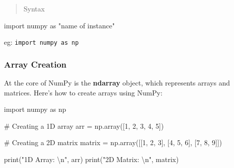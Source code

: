 \documentclass[
  letterpaper,
  DIV=11,
  numbers=noendperiod]{scrreprt}
\newenvironment{Shaded}{\begin{snugshade}}{\end{snugshade}}
\newcommand{\BuiltInTok}[1]{\textcolor[rgb]{0.00,0.23,0.31}{#1}}
\newcommand{\CharTok}[1]{\textcolor[rgb]{0.13,0.47,0.30}{#1}}
\newcommand{\CommentTok}[1]{\textcolor[rgb]{0.37,0.37,0.37}{#1}}
\newcommand{\DecValTok}[1]{\textcolor[rgb]{0.68,0.00,0.00}{#1}}
\newcommand{\ImportTok}[1]{\textcolor[rgb]{0.00,0.46,0.62}{#1}}
\newcommand{\NormalTok}[1]{\textcolor[rgb]{0.00,0.23,0.31}{#1}}
\newcommand{\OperatorTok}[1]{\textcolor[rgb]{0.37,0.37,0.37}{#1}}
\newcommand{\StringTok}[1]{\textcolor[rgb]{0.13,0.47,0.30}{#1}}
\theoremstyle{plain}
\theoremstyle{definition}
\theoremstyle{remark}
\begin{document}
\begin{tcolorbox}[enhanced jigsaw, leftrule=.75mm, bottomtitle=1mm, colback=white, toptitle=1mm, opacitybacktitle=0.6, toprule=.15mm, colbacktitle=quarto-callout-note-color!10!white, arc=.35mm, colframe=quarto-callout-note-color-frame, title=\textcolor{quarto-callout-note-color}{\faInfo}\hspace{0.5em}{Loading \texttt{numpy} to a python programme}, titlerule=0mm, rightrule=.15mm, left=2mm, bottomrule=.15mm, breakable, coltitle=black, opacityback=0]

\begin{quote}
Syntax
\end{quote}

\begin{Shaded}
\begin{Highlighting}[]
\ImportTok{import}\NormalTok{ numpy }\ImportTok{as} \StringTok{"name of instance"}
\end{Highlighting}
\end{Shaded}

eg: \texttt{import\ numpy\ as\ np}

\end{tcolorbox}

\subsubsection{Array Creation}\label{array-creation}

At the core of NumPy is the \textbf{ndarray} object, which represents
arrays and matrices. Here's how to create arrays using NumPy:

\begin{Shaded}
\begin{Highlighting}[]
\ImportTok{import}\NormalTok{ numpy }\ImportTok{as}\NormalTok{ np}

\CommentTok{\# Creating a 1D array}
\NormalTok{arr }\OperatorTok{=}\NormalTok{ np.array([}\DecValTok{1}\NormalTok{, }\DecValTok{2}\NormalTok{, }\DecValTok{3}\NormalTok{, }\DecValTok{4}\NormalTok{, }\DecValTok{5}\NormalTok{])}

\CommentTok{\# Creating a 2D matrix}
\NormalTok{matrix }\OperatorTok{=}\NormalTok{ np.array([[}\DecValTok{1}\NormalTok{, }\DecValTok{2}\NormalTok{, }\DecValTok{3}\NormalTok{], [}\DecValTok{4}\NormalTok{, }\DecValTok{5}\NormalTok{, }\DecValTok{6}\NormalTok{], [}\DecValTok{7}\NormalTok{, }\DecValTok{8}\NormalTok{, }\DecValTok{9}\NormalTok{]])}

\BuiltInTok{print}\NormalTok{(}\StringTok{"1D Array: }\CharTok{\textbackslash{}n}\StringTok{"}\NormalTok{, arr)}
\BuiltInTok{print}\NormalTok{(}\StringTok{"2D Matrix: }\CharTok{\textbackslash{}n}\StringTok{"}\NormalTok{, matrix)}
\end{Highlighting}
\end{Shaded}
\end{document}
